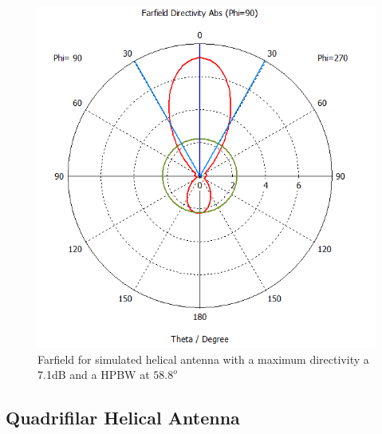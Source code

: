 \begin{figure}[H]
\centering 
\includegraphics[scale = 0.5]{figures/antennas/helical/helical_cst_farfield}
\caption{Farfield for simulated helical antenna with a maximum directivity a 7.1dB and a HPBW at $58.8^o$}
\label{fig:helical_farfield}
\end{figure}

\subsection{Quadrifilar Helical Antenna}

